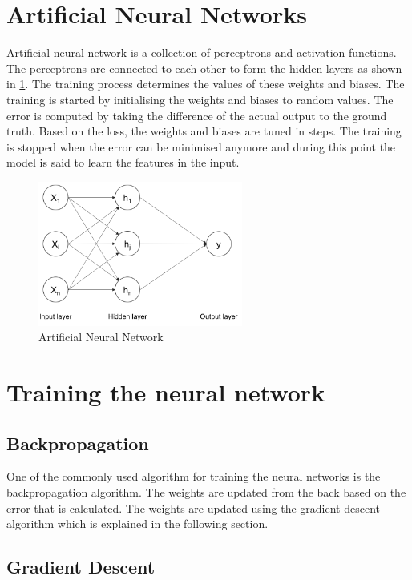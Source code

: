 \documentclass[a4paper, 12pt, oneside, BCOR1cm,toc=chapterentrywithdots]{scrbook}
\begin{document}
 

\section{Artificial Neural Networks}

Artificial neural network is a collection of perceptrons and activation functions. The perceptrons are connected to each other to form the hidden layers as shown in \ref{fig:pic7}. The training process determines the values of these weights and biases. The training is started by initialising the weights and biases to random values. The error is computed by taking the difference of the actual output to the ground truth. Based on the loss, the weights and biases are tuned in steps. The training is stopped when the error can be minimised anymore and during this point the model is said to learn the features in the input.


\begin{figure}[h]
\centering
\includegraphics[width=0.6\textwidth]{image7.png}
\caption{Artificial Neural Network}
\label{fig:pic7}
\end{figure}


\section{Training the neural network}

\subsection{Backpropagation}

One of the commonly used algorithm for training the neural networks is the backpropagation algorithm. The weights are updated from the back based on the error that is calculated. The weights are updated using the gradient descent algorithm which is explained in the following section.

\subsection{Gradient Descent}
\end{document}
